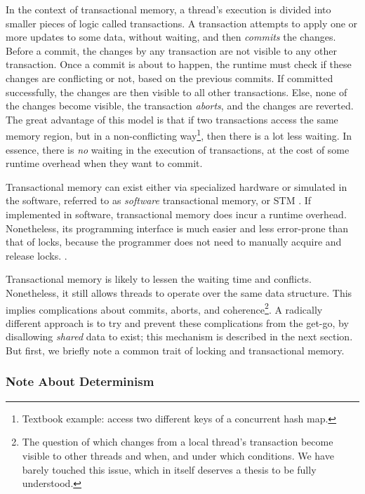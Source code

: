 In the context of transactional memory, a thread's execution is divided into smaller pieces of logic
called transactions. A transaction attempts to apply one or more updates to some data, without
waiting, and then \textit{commits} the changes. Before a commit, the changes by any transaction are
not visible to any other transaction. Once a commit is about to happen, the runtime must check if
these changes are conflicting or not, based on the previous commits. If committed successfully, the
changes are then visible to all other transactions. Else, none of the changes become visible, the
transaction \textit{aborts}, and the changes are reverted. The great advantage of this model is that
if two transactions access the same memory region, but in a non-conflicting way\footnote{Textbook
example: access two different keys of a concurrent hash map.}, then there is a lot less waiting. In
essence, there is \textit{no} waiting in the execution of transactions, at the cost of some runtime
overhead when they want to commit.

Transactional memory can exist either via specialized hardware or simulated in the software,
referred to as \textit{software} transactional memory, or STM
\cite{hammondTransactionalMemoryCoherence2004}. If implemented in software, transactional memory
does incur a runtime overhead. Nonetheless, its programming interface is much easier and less
error-prone than that of locks, because the programmer does not need to manually acquire and release
locks. \cite{herlihyTransactionalMemoryArchitectural1993}.

Transactional memory is likely to lessen the waiting time and conflicts. Nonetheless, it still
allows threads to operate over the same data structure. This implies complications about commits,
aborts, and coherence\footnote{The question of which changes from a local thread's transaction
become visible to other threads and when, and under which conditions. We have barely touched this
issue, which in itself deserves a thesis to be fully understood.}. A radically different approach is
to try and prevent these complications from the get-go, by disallowing \textit{shared} data to
exist; this mechanism is described in the next section. But first, we briefly note a common trait of
locking and transactional memory.

\subsubsection*{Note About Determinism}

